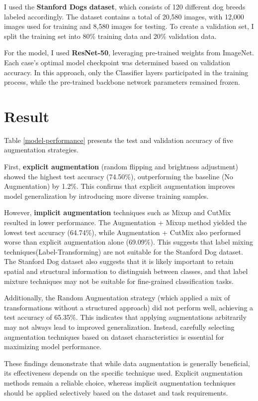 \documentclass{article}
\begin{document}
I used the {\bf Stanford Dogs dataset}, which consists of 120 different dog breeds labeled accordingly. The dataset contains a total of 20,580 images, with 12,000 images used for training and 8,580 images for testing. To create a validation set, I split the training set into 80\% training data and 20\% validation data.

For the model, I used {\bf ResNet-50}, leveraging pre-trained weights from ImageNet. Each case's optimal model checkpoint was determined based on validation accuracy. In this approach, only the Classifier layers participated in the training process, while the pre-trained backbone network parameters remained frozen.


\section{Result}
\label{headings}

Table \ref{model-performance} presents the test and validation accuracy of five augmentation strategies.

First, {\bf explicit augmentation} (random flipping and brightness adjustment) showed the highest test accuracy (74.50\%), outperforming the baseline (No Augmentation) by 1.2\%. This confirms that explicit augmentation improves model generalization by introducing more diverse training samples.

However, {\bf implicit augmentation} techniques such as Mixup and CutMix resulted in lower performance. The Augmentation + Mixup method yielded the lowest test accuracy (64.74\%), while Augmentation + CutMix also performed worse than explicit augmentation alone (69.09\%).  This suggests that label mixing techniques(Label-Transforming) are not suitable for the Stanford Dog dataset. The Stanford Dog dataset also suggests that it is likely important to retain spatial and structural information to distinguish between classes, and that label mixture techniques may not be suitable for fine-grained classification tasks.

Additionally, the Random Augmentation strategy (which applied a mix of transformations without a structured approach) did not perform well, achieving a test accuracy of 65.35\%. This indicates that applying augmentations arbitrarily may not always lead to improved generalization. Instead, carefully selecting augmentation techniques based on dataset characteristics is essential for maximizing model performance.

These findings demonstrate that while data augmentation is generally beneficial, its effectiveness depends on the specific technique used. Explicit augmentation methods remain a reliable choice, whereas implicit augmentation techniques should be applied selectively based on the dataset and task requirements.
\end{document}
